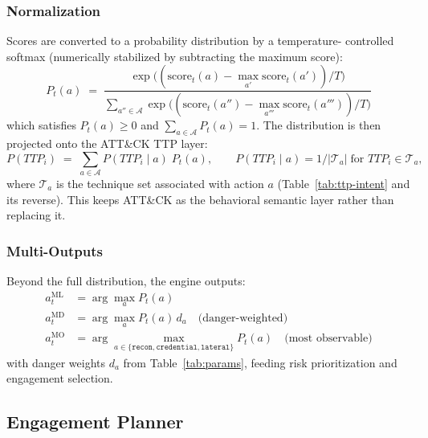 \documentclass[preprints,article,accept,oneauthor]{Definitions/mdpi}
\newcommand{\act}[1]{\texttt{#1}}
\begin{document}
\subsubsection{Normalization}
\label{sec:softmax}

Scores are converted to a probability distribution by a temperature-
controlled softmax (numerically stabilized by subtracting the maximum
score):
\begin{equation}
\label{eq:softmax}
P_t(a) \;=\; \frac{\exp\!\big((\mathrm{score}_t(a) -
\max_{a'}\mathrm{score}_t(a'))/T\big)}
{\sum_{a'' \in \mathcal{A}} \exp\!\big((\mathrm{score}_t(a'') -
\max_{a'''}\mathrm{score}_t(a'''))/T\big)}
\end{equation}
which satisfies $P_t(a) \geq 0$ and $\sum_{a \in \mathcal{A}} P_t(a) = 1$.
The distribution is then projected onto the ATT\&CK TTP layer:
\begin{equation}
\label{eq:ttp-proj}
P(\mathit{TTP}_i) \;=\; \sum_{a \in \mathcal{A}}
P(\mathit{TTP}_i \mid a)\; P_t(a),
\qquad
P(\mathit{TTP}_i \mid a) = 1/|\mathcal{T}_a| \;\text{for } \mathit{TTP}_i
\in \mathcal{T}_a,
\end{equation}
where $\mathcal{T}_a$ is the technique set associated with action $a$
(Table~\ref{tab:ttp-intent} and its reverse). This keeps ATT\&CK as the
behavioral semantic layer rather than replacing it.

\subsubsection{Multi-Outputs}

Beyond the full distribution, the engine outputs:
\begin{align}
a^{\mathrm{ML}}_t &= \arg\max_a P_t(a) \label{eq:most-likely} \\
a^{\mathrm{MD}}_t &= \arg\max_a P_t(a)\, d_a \quad\text{(danger-weighted)}
\label{eq:most-dangerous} \\
a^{\mathrm{MO}}_t &= \arg\max_{a \in \{\act{recon},\act{credential},
\act{lateral}\}} P_t(a) \quad\text{(most observable)}
\label{eq:most-observable}
\end{align}
with danger weights $d_a$ from Table~\ref{tab:params}, feeding risk
prioritization and engagement selection.

\subsection{Engagement Planner}
\label{sec:engagement}
\end{document}

